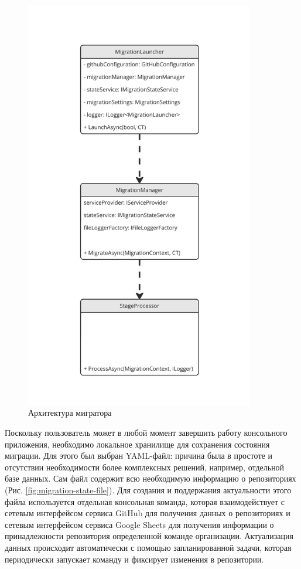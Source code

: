 \begin{figure}[H]
  \centering
  \includegraphics[width=10cm]{img/gitlab-migrator-app-architecture}
  \caption{Архитектура мигратора}
  \label{fig:gitlab-migrator-app-architecture}
\end{figure}

Поскольку пользователь может в любой момент завершить работу консольного приложения, необходимо локальное хранилище для сохранения состояния миграции.
Для этого был выбран YAML-файл: причина была в простоте и отсутствии необходимости более комплексных решений, например, отдельной базе данных.
Сам файл содержит всю необходимую информацию о репозиториях (Рис. \ref{fig:migration-state-file}).
Для создания и поддержания актуальности этого файла используется отдельная консольная команда,
которая взаимодействует с сетевым интерфейсом сервиса GitHub для получения данных о репозиториях и сетевым интерфейсом сервиса Google Sheets для получения информации о принадлежности репозитория определенной команде организации.
Актуализация данных происходит автоматически с помощью запланированной задачи, которая периодически запускает команду и фиксирует изменения в репозитории.

